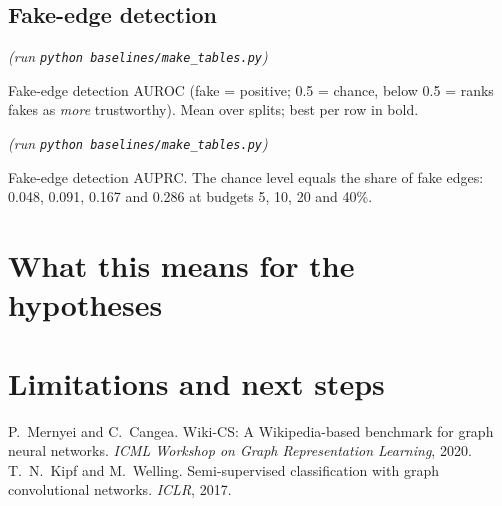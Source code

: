 \documentclass[11pt]{article}
\newcommand{\nodetable}{\emph{(run \texttt{python baselines/make\_tables.py})}}%
\newcommand{\aurocTable}{\nodetable}\newcommand{\auprcTable}{\nodetable}%
\begin{document}

\subsection{Fake-edge detection}

\begin{table}[h]
\centering\small
\aurocTable
\caption{Fake-edge detection AUROC (fake = positive; 0.5 = chance, below 0.5 = ranks fakes
as \emph{more} trustworthy). Mean over \nsplits{} splits; best per row in bold.}
\label{tab:auroc}
\end{table}

\begin{table}[h]
\centering\small
\auprcTable
\caption{Fake-edge detection AUPRC. The chance level equals the share of fake edges:
0.048, 0.091, 0.167 and 0.286 at budgets 5, 10, 20 and 40\%.}
\label{tab:auprc}
\end{table}


\section{What this means for the hypotheses}

\section{Limitations and next steps}

\begin{thebibliography}{9}
 P.~Mernyei and C.~Cangea. Wiki-CS: A Wikipedia-based benchmark for graph
  neural networks. \emph{ICML Workshop on Graph Representation Learning}, 2020.
 T.~N.~Kipf and M.~Welling. Semi-supervised classification with graph
  convolutional networks. \emph{ICLR}, 2017.
\end{thebibliography}
\end{document}

